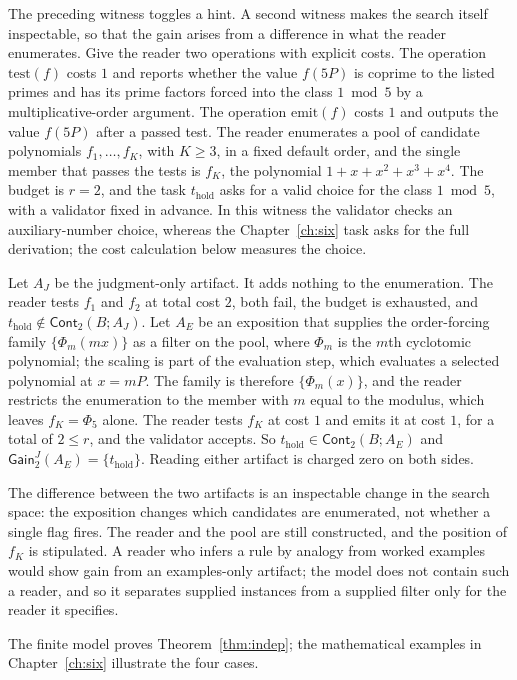 \documentclass[11pt]{book}
\theoremstyle{definition}
\theoremstyle{remark}
\newcommand{\Cont}{\mathsf{Cont}}
\newcommand{\Gain}{\mathsf{Gain}}
\begin{document}
The preceding witness toggles a hint. A second witness makes the search itself inspectable, so that the gain arises from a difference in what the reader enumerates. Give the reader two operations with explicit costs. The operation $\mathrm{test}(f)$ costs $1$ and reports whether the value $f(5P)$ is coprime to the listed primes and has its prime factors forced into the class $1\bmod5$ by a multiplicative-order argument. The operation $\mathrm{emit}(f)$ costs $1$ and outputs the value $f(5P)$ after a passed test. The reader enumerates a pool of candidate polynomials $f_1,\dots,f_K$, with $K\ge3$, in a fixed default order, and the single member that passes the tests is $f_K$, the polynomial $1+x+x^2+x^3+x^4$. The budget is $r=2$, and the task $t_{\mathrm{hold}}$ asks for a valid choice for the class $1\bmod5$, with a validator fixed in advance. In this witness the validator checks an auxiliary-number choice, whereas the Chapter~\ref{ch:six} task asks for the full derivation; the cost calculation below measures the choice.

Let $A_J$ be the judgment-only artifact. It adds nothing to the enumeration. The reader tests $f_1$ and $f_2$ at total cost $2$, both fail, the budget is exhausted, and $t_{\mathrm{hold}}\notin\Cont_2(B;A_J)$. Let $A_E$ be an exposition that supplies the order-forcing family $\{\Phi_m(mx)\}$ as a filter on the pool, where $\Phi_m$ is the $m$th cyclotomic polynomial; the scaling is part of the evaluation step, which evaluates a selected polynomial at $x=mP$. The family is therefore $\{\Phi_m(x)\}$, and the reader restricts the enumeration to the member with $m$ equal to the modulus, which leaves $f_K=\Phi_5$ alone. The reader tests $f_K$ at cost $1$ and emits it at cost $1$, for a total of $2\le r$, and the validator accepts. So $t_{\mathrm{hold}}\in\Cont_2(B;A_E)$ and $\Gain^J_2(A_E)=\{t_{\mathrm{hold}}\}$. Reading either artifact is charged zero on both sides.

The difference between the two artifacts is an inspectable change in the search space: the exposition changes which candidates are enumerated, not whether a single flag fires. The reader and the pool are still constructed, and the position of $f_K$ is stipulated. A reader who infers a rule by analogy from worked examples would show gain from an examples-only artifact; the model does not contain such a reader, and so it separates supplied instances from a supplied filter only for the reader it specifies.

The finite model proves Theorem~\ref{thm:indep}; the mathematical examples in Chapter~\ref{ch:six} illustrate the four cases.
\end{document}
